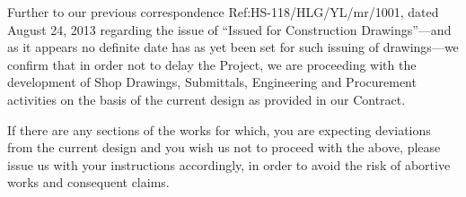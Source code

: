 \documentclass[a4paper,12pt,oneside]{article}
\begin{document}
\begin{contractual}

Further to our previous correspondence Ref:HS-118/HLG/YL/mr/1001, dated August 24, 2013 regarding the issue of ``Issued for Construction Drawings''---and as it appears no definite date has as yet been set for such issuing of drawings---we confirm that in order not to delay the Project, we are proceeding with the development of Shop Drawings, Submittals, Engineering and Procurement activities on the basis of the current design as provided in our Contract.

If there are any sections of the works for which, you are expecting deviations from the current design and you wish us not to proceed with the above, please issue us with your instructions accordingly, in order to avoid the risk of abortive works and consequent claims.


\end{contractual}
\end{document}
